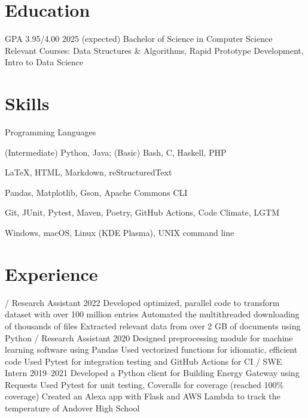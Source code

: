 \section{Education}
\begin{doutline}
     GPA 3.95/4.00 \hfill 2025 (expected)
        \2 Bachelor of Science in Computer Science
        \2 Relevant Courses: Data Structures \& Algorithms, Rapid Prototype Development, Intro to Data Science
\end{doutline}

\section{Skills}
\begin{labeling}{Programming Languages}
    \item [Programming Languages] (Intermediate) Python, Java; (Basic) Bash, C, Haskell, PHP
    \item [Markup Languages] \LaTeX, HTML, Markdown, reStructuredText
    \item [Libraries] Pandas, Matplotlib, Gson, Apache Commons CLI
    \item [Tools] Git, JUnit, Pytest, Maven, Poetry, GitHub Actions, Code Climate, LGTM
    \item [Operating Systems] Windows, macOS, Linux (KDE Plasma), UNIX command line
\end{labeling}

\section{Experience}
\begin{doutline}
     / Research Assistant \hfill 2022
        \2 Developed optimized, parallel code to transform dataset with over 100 million entries
        \2 Automated the multithreaded downloading of thousands of files
        \2 Extracted relevant data from over 2 GB of documents using Python
     / Research Assistant \hfill 2020
        \2 Designed preprocessing module for machine learning software using Pandas
            \3 Used vectorized functions for idiomatic, efficient code
            \3 Used Pytest for integration testing and GitHub Actions for CI
     / SWE Intern \hfill 2019--2021
        \2 Developed a Python client for Building Energy Gateway using Requests
            \3 Used Pytest for unit testing, Coveralls for coverage (reached 100\% coverage)
        \2 Created an Alexa app with Flask and AWS Lambda to track the temperature of Andover High School
\end{doutline}

